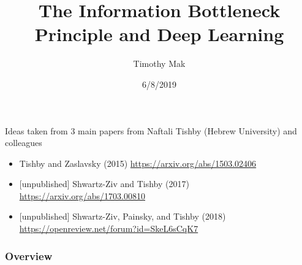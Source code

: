 \documentclass{beamer}
\title[]{The Information Bottleneck Principle and Deep Learning} %
\author{Timothy Mak} %
\institute[Fano Labs] %
{
	Fano Labs, Hong Kong \\ %
	\medskip
}
\date{6/8/2019} %
\begin{document}
	
	\begin{frame}
	\titlepage %
	\end{frame}

\begin{frame}
Ideas taken from 3 main papers from Naftali Tishby (Hebrew University) and colleagues 
\begin{itemize}
	\item Tishby and Zaslavsky (2015) \url{https://arxiv.org/abs/1503.02406}
	\item{} [unpublished] Shwartz-Ziv and Tishby (2017) \url{https://arxiv.org/abs/1703.00810}
	\item{} [unpublished] Shwartz-Ziv, Painsky, and Tishby (2018) \url{https://openreview.net/forum?id=SkeL6sCqK7}
\end{itemize}

\end{frame}


\begin{frame}
\frametitle{Overview} %
\tableofcontents %
\end{frame}


\end{document}
